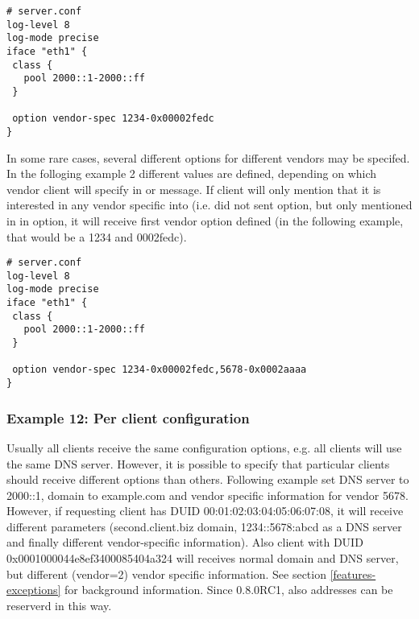 \begin{lstlisting}
# server.conf
log-level 8
log-mode precise
iface "eth1" {
 class {
   pool 2000::1-2000::ff
 }

 option vendor-spec 1234-0x00002fedc
}
\end{lstlisting}

In some rare cases, several different options for different vendors
may be specifed. In the folloging example 2 different values are
defined, depending on which vendor client will specify in  or
 message. If client will only mention that it is interested in
any vendor specific into (i.e. did not sent  option, but
only mentioned in in  option, it will receive
first vendor option defined (in the following example, that would be a
1234 and 0002fedc).

\begin{lstlisting}
# server.conf
log-level 8
log-mode precise
iface "eth1" {
 class {
   pool 2000::1-2000::ff
 }

 option vendor-spec 1234-0x00002fedc,5678-0x0002aaaa
}
\end{lstlisting}

\subsubsection{Example 12: Per client configuration}
\label{example-server-exceptions}
Usually all clients receive the same configuration options, e.g. all
clients will use the same DNS server. However, it is possible to
specify that particular clients should receive different options than
others. Following example set DNS server to 2000::1, domain
to example.com and vendor specific information for vendor 5678.
However, if requesting client has DUID 00:01:02:03:04:05:06:07:08, it
will receive different parameters (second.client.biz domain,
1234::5678:abcd as a DNS server and finally different vendor-specific
information). Also client with DUID 0x0001000044e8ef3400085404a324
will receives normal domain and DNS server, but different (vendor=2)
vendor specific information. See section \ref{features-exceptions} for
background information. Since 0.8.0RC1, also addresses can be reserverd
in this way.

